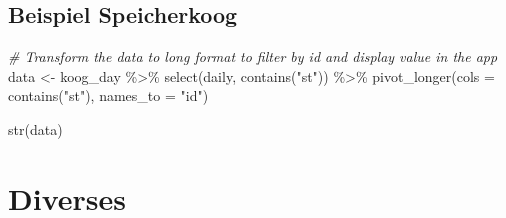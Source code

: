 \documentclass[
]{article}
\newenvironment{Shaded}{\begin{snugshade}}{\end{snugshade}}
\newcommand{\AttributeTok}[1]{\textcolor[rgb]{0.77,0.63,0.00}{#1}}
\newcommand{\CommentTok}[1]{\textcolor[rgb]{0.56,0.35,0.01}{\textit{#1}}}
\newcommand{\ControlFlowTok}[1]{\textcolor[rgb]{0.13,0.29,0.53}{\textbf{#1}}}
\newcommand{\FunctionTok}[1]{\textcolor[rgb]{0.00,0.00,0.00}{#1}}
\newcommand{\NormalTok}[1]{#1}
\newcommand{\OtherTok}[1]{\textcolor[rgb]{0.56,0.35,0.01}{#1}}
\newcommand{\SpecialCharTok}[1]{\textcolor[rgb]{0.00,0.00,0.00}{#1}}
\newcommand{\StringTok}[1]{\textcolor[rgb]{0.31,0.60,0.02}{#1}}
\begin{document}
\begin{Shaded}
\end{Shaded}

\hypertarget{beispiel-speicherkoog}{%
\subsection{Beispiel Speicherkoog}\label{beispiel-speicherkoog}}

\begin{Shaded}
\begin{Highlighting}[]
\CommentTok{\# Transform the data to long format to filter by id and display value in the app}
\NormalTok{data }\OtherTok{\textless{}{-}}\NormalTok{ koog\_day }\SpecialCharTok{\%\textgreater{}\%}
  \FunctionTok{select}\NormalTok{(daily, }\FunctionTok{contains}\NormalTok{(}\StringTok{"st"}\NormalTok{)) }\SpecialCharTok{\%\textgreater{}\%}
  \FunctionTok{pivot\_longer}\NormalTok{(}\AttributeTok{cols =} \FunctionTok{contains}\NormalTok{(}\StringTok{"st"}\NormalTok{), }\AttributeTok{names\_to =} \StringTok{"id"}\NormalTok{)}

\FunctionTok{str}\NormalTok{(data)}
\end{Highlighting}
\end{Shaded}

\hypertarget{diverses}{%
\section{Diverses}\label{diverses}}
\end{document}
